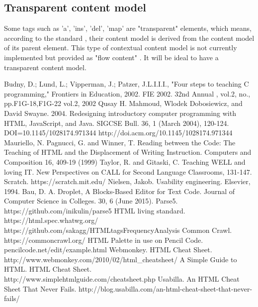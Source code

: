 \documentclass[conference]{IEEEtran}
\begin{document}
\subsection{Transparent content model}
Some tags such as 'a', 'ins', 'del', 'map' are "transparent" elements, which means, according to the standard \cite{whatwgtransparent}, their content model is derived from the content model of its parent element. This type of contextual content model is not currently implemented but provided as "flow content" \cite{flowcontent}.  It will be ideal to have a transparent content model.

\begin{thebibliography}{1}

  Budny, D.; Lund, L.; Vipperman, J.; Patzer, J.L.I.I.I., "Four steps to teaching C programming," Frontiers in Education, 2002. FIE 2002. 32nd Annual , vol.2, no., pp.F1G-18,F1G-22 vol.2, 2002
  Qusay H. Mahmoud, Wlodek Dobosiewicz, and David Swayne. 2004. Redesigning introductory computer programming with HTML, JavaScript, and Java. SIGCSE Bull. 36, 1 (March 2004), 120-124. DOI=10.1145/1028174.971344 http://doi.acm.org/10.1145/1028174.971344
  Mauriello, N. Pagnucci, G. and Winner, T. Reading between the Code: The Teaching of HTML and the Displacement of Writing Instruction. Computers and Composition 16, 409-19 (1999)
  Taylor, R. and Gitaski, C. Teaching WELL and loving IT. New Perspectives on CALL for Second Language Classrooms, 131-147.
  Scratch. https://scratch.mit.edu/
  Nielsen, Jakob. Usability engineering. Elsevier, 1994.
  Bau, D. A. Droplet, A Blocks-Based Editor for Text Code. Journal of Computer Science in Colleges. 30, 6 (June 2015).
  Parse5. https://github.com/inikulin/parse5
  HTML living standard. https://html.spec.whatwg.org/
  https://github.com/sakagg/HTMLtagsFrequencyAnalysis
  Common Crawl. https://commoncrawl.org/
  HTML Palette in use on Pencil Code. pencilcode.net/edit/example.html
  Webmonkey. HTML Cheat Sheet.\\ http://www.webmonkey.com/2010/02/html\_cheatsheet/
  A Simple Guide to HTML. HTML Cheat Sheet.\\ http://www.simplehtmlguide.com/cheatsheet.php
  Usabilla. An HTML Cheat Sheet That Never Fails. http://blog.usabilla.com/an-html-cheat-sheet-that-never-fails/

\end{thebibliography}
\end{document}
